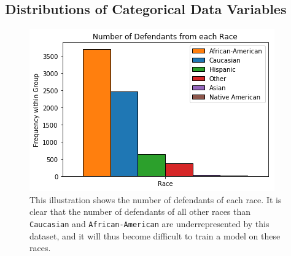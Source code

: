 \documentclass[11pt, fleqn, titlepage]{article}
\begin{document}
	\subsection{Distributions of Categorical Data Variables}
	\begin{figure}[H]
		\centering
		\includegraphics[width=0.5\linewidth]{imgs/races}
		\caption{This illustration shows the number of defendants of each race. It is clear that the number of defendants of all other races than \texttt{Caucasian} and \texttt{African-American} are underrepresented by this dataset, and it will thus become difficult to train a model on these races.}
		\label{fig:races}
	\end{figure}
	
\end{document}
